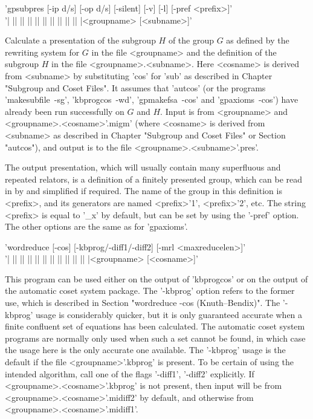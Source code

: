'gpsubpres [-ip d/s] [-op d/s] [-silent] [-v] [-l] [-pref <prefix>]'\\
'| || || || || || || || || || |<groupname> [<subname>]'

Calculate a presentation of the subgroup $H$ of the group $G$ as defined
by the rewriting system for $G$ in the file <groupname> and the
definition of the subgroup $H$ in the file <groupname>.<subname>.
Here <cosname> is derived from <subname> by substituting
'cos' for 'sub' as described in Chapter "Subgroup and Coset Files".
It assumes that 'autcos' (or the programs 'makesubfile\ -sg', 'kbprogcos\ -wd',
'gpmakefsa\ -cos' and 'gpaxioms\ -cos') have already been run successfully on
$G$ and $H$.
Input is from <groupname> and <groupname>.<cosname>'.migm'
(where <cosname> is derived from <subname> as described in
Chapter "Subgroup and Coset Files" or Section "autcos"), and output
is to the file <groupname>.<subname>'.pres'.

The output presentation, which will usually contain many superfluous and
repeated relators, is a {\GAP} definition of a finitely presented group, which
can be read in by {\GAP} and simplified if required. The name of the group in
this definition is <prefix>, and its generators are named <prefix>'1',
<prefix>'2', etc.  The string <prefix> is equal to '\_x' by default, but can be
set by using the '-pref' option.  The other options are the same as for
'gpaxioms'.

'wordreduce [-cos] [-kbprog/-diff1/-diff2] [-mrl <maxreducelen>]'\\
'| || || || || || || || || || || |<groupname> [<cosname>]'

This program can be used either on the output of 'kbprogcos' or on the output
of the automatic coset system package. The '-kbprog' option refers to the former
use, which is described in Section "wordreduce -cos (Knuth--Bendix)".
The '-kbprog' usage is considerably quicker, but it is only guaranteed
accurate when a finite confluent set of equations has been calculated. 
The automatic coset system programs are normally only used when such a set
cannot be found, in which case the usage here is the only
accurate one available.
The '-kbprog' usage is the default if the file <groupname>'.kbprog' is present.
To be certain of using the intended algorithm, call one of the flags
'-diff1', '-diff2' explicitly.
If <groupname>.<cosname>'.kbprog' is not present, then input will be from
<groupname>.<cosname>'.midiff2' by default, and otherwise from
<groupname>.<cosname>'.midiff1'.

